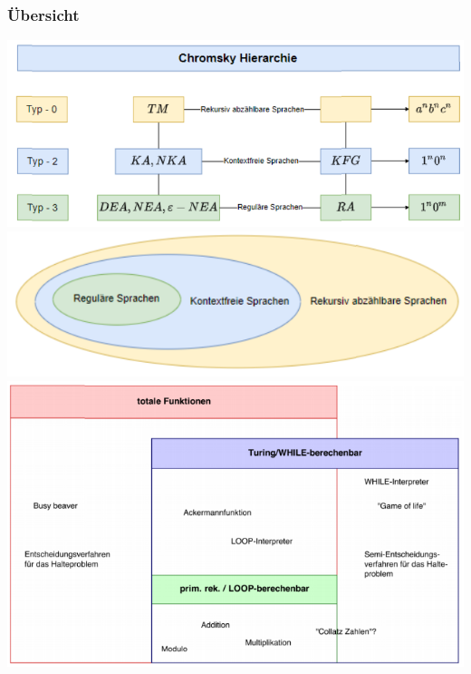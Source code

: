 \subsubsection*{Übersicht}
\includegraphics[width=0.8\linewidth]{chomsky_hierarchie.png}\\
\includegraphics[width=0.5\linewidth]{sprachen.png}\\
\includegraphics[width=1\linewidth]{funktionen.png}
